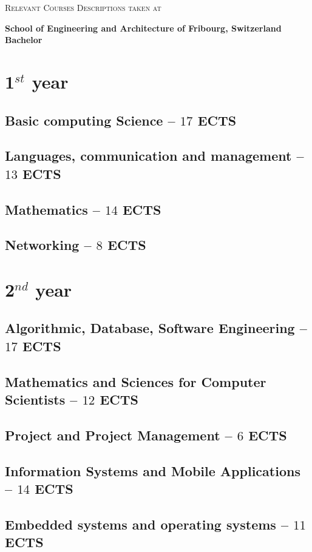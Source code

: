 \documentclass[11pt]{article}
\newcommand*{\heia}{School of Engineering and Architecture of Fribourg}
\newcommand{\module}[2]{
    \subsection{#1 \small -- $#2$ ECTS}
}
\begin{document}
\textsc{\LARGE Relevant Courses Descriptions taken at}%
\begin{center}
    \textbf{\heia{}, Switzerland\\Bachelor}
\end{center}


%
%
\section{1$^{st}$ year}
\module{Basic computing Science}{17}
\pagebreak

\module{Languages, communication and management}{13}
\pagebreak

\module{Mathematics}{14}
\pagebreak
\pagebreak

\module{Networking}{8}


%
%
\section{2$^{nd}$ year}
\module{Algorithmic, Database, Software Engineering}{17}
\pagebreak
\module{Mathematics and Sciences for Computer Scientists}{12}
\module{Project and Project Management}{6}
\module{Information Systems and Mobile Applications}{14}
\module{Embedded systems and operating systems}{11}
\end{document}
